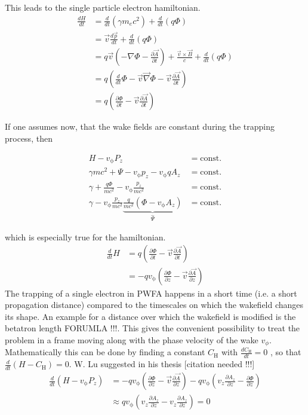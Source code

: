 \documentclass{thesis}
\begin{document}
This leads to the single particle electron hamiltonian. 
\begin{align}
\frac{dH}{dt}&=\frac{d}{dt} (\gamma m_e c^2)+\frac{d}{dt}(q\Phi)\\
&=\vec{v}\frac{d\vec{p}}{dt}+\frac{d}{dt}(q\Phi)\\
&=q\vec{v}(-\nabla \Phi-\frac{\partial \vec{A}}{\partial t})+\frac{\vec{v}\times\vec{B}}{c}+\frac{d}{dt}(q\Phi)\\
&=q(\frac{d}{dt}\Phi-\vec{v}\vec{\nabla}\Phi-\vec{v}\frac{\partial \vec{A}}{\partial t})\\
&=q(\frac{\partial \Phi}{\partial t}-\vec{v}\frac{\partial \vec{A}}{\partial t})
\end{align}

If one assumes now, that the wake fields are constant during the trapping process, then 

\begin{align}
H-v_\mathrm{\phi}P_z &= \mathrm{const.}\\
\gamma m c^2+\Psi-v_\mathrm{\phi}p_z-v_\mathrm{\phi}qA_z &= \mathrm{const.}\\
\gamma+\frac{q \Phi}{m c^2}-v_\mathrm{\phi} \frac{p_z}{mc^2} &= \mathrm{const.}\\
\gamma - v_\mathrm{\phi} \frac{p_z}{mc^2} \underbrace{\frac{q}{mc^2}(\Phi-v_\mathrm{\phi}A_z)}_{\hat{\Psi}}  &= \mathrm{const.} 
\end{align}

which is especially true for the hamiltonian.
\begin{align*}
\frac{d}{dt}H&=q(\frac{\partial \Phi}{\partial t}-\vec{v}\frac{\partial \vec{A}}{\partial t})\\
&=-q v_\mathrm{\phi}(\frac{\partial \Phi}{\partial z}-\vec{v} \frac{\partial \vec{A}}{\partial z})
\end{align*}
The trapping of a single electron in PWFA happens in a short time (i.e. a short propagation distance) compared to the timescales on which the wakefield changes its shape. An example for a distance over which the wakefield is modified is the betatron length FORUMLA !!!.
This gives the convenient possibility to treat the problem in a frame moving along with the phase velocity of the wake $v_\phi$. Mathematically this can be done by finding a constant $C_\mathrm{H}$ with $\frac{d C_\mathrm{H}}{dt}=0$ , so that $\frac{d}{dt}(H-C_\mathrm{H})=0$.
W. Lu suggested in his thesis [citation needed !!!] 
\begin{align*}
\frac{d}{dt}(H-v_\mathrm{\phi} P_z)&=-qv_\mathrm{\phi}(\frac{\partial \Phi}{\partial z}-\vec{v}\frac{\partial \vec{A}}{\partial z})-qv_\mathrm{\phi}(v_z \frac{\partial A_z}{\partial z}-\frac{\partial \Phi}{\partial z})\\
&\approx q v_\mathrm{\phi}(v_z \frac{\partial A_z}{\partial z}-v_z \frac{\partial A_z}{\partial z})=0
\end{align*}
\end{document}
